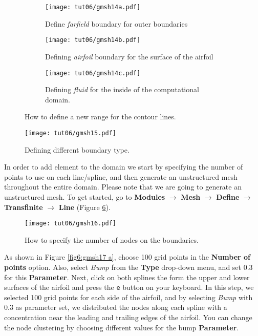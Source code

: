 \begin{figure}[htbp]
    \centering
     \begin{subfigure}[b]{.4\textwidth}
         \centering
         \texttt{[image: tut06/gmsh14a.pdf]}
         \caption{Define \textit{farfield} boundary for outer boundaries}
         \label{fig6:gmsh14 a}
     \end{subfigure}
     \hfill
     \begin{subfigure}[b]{.4\textwidth}
         \centering
         \texttt{[image: tut06/gmsh14b.pdf]}
         \caption{Defining \textit{airfoil} boundary for the surface of the airfoil}
         \label{fig6:gmsh14 b}
     \end{subfigure}  
     \hfill
     \begin{subfigure}[b]{.4\textwidth}
         \centering
         \texttt{[image: tut06/gmsh14c.pdf]}
         \caption{Defining \textit{fluid} for the inside of the computational domain.}
         \label{fig6:gmsh14 c}
     \end{subfigure} 
    \caption{How to define a new range for the contour lines.}
    \label{fig6:gmsh14}
\end{figure}
\begin{figure}[htbp]
    \centering
    \texttt{[image: tut06/gmsh15.pdf]}
    \caption{Defining different boundary type.}
    \label{fig6:gmsh15}
\end{figure}
In order to add element to the domain we start by specifying the number of points to use on each line/spline, and then generate an unstructured mesh throughout the entire domain. Please note that we are going to generate an unstructured mesh. To get started, go to \textbf{Modules} $\rightarrow$ \textbf{Mesh} $\rightarrow$ \textbf{Define} $\rightarrow$ \textbf{Transfinite} $\rightarrow$ \textbf{Line} (Figure \ref{fig6:gmsh16}).
\begin{figure}[htbp]
    \centering
    \texttt{[image: tut06/gmsh16.pdf]}
    \caption{How to specify the number of nodes on the boundaries.}
    \label{fig6:gmsh16}
\end{figure}
As shown in Figure \ref{fig6:gmsh17 a}, choose 100 grid points in the \textbf{Number of points} option. Also, select \textit{Bump} from the \textbf{Type} drop-down menu, and set 0.3 for this \textbf{Parameter}. Next, click on both splines the form the upper and lower surfaces of the airfoil and press the \texttt{e} button on your keyboard. In this step, we selected 100 grid points for each side of the airfoil, and by selecting \textit{Bump} with 0.3 as parameter set, we distributed the nodes along each spline with a concentration near the leading and trailing edges of the airfoil. You can change the node clustering by choosing different values for the bump \textbf{Parameter}.
